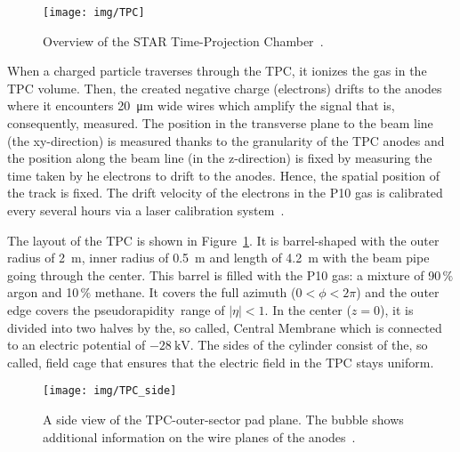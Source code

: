 \begin{figure}[htb]
\begin{center}
 \texttt{[image: img/TPC]}\\
\end{center}
\caption[Overview of the STAR Time-Projection Chamber.]{\label{TPC}Overview of the STAR Time-Projection Chamber~\cite{TpcNim}.}
\end{figure}


 

When a charged particle traverses through the TPC, it ionizes the gas in the TPC volume. Then, the created negative 
charge (electrons) drifts to the anodes where it encounters \SI{20}{\micro\metre} wide wires which amplify the signal that is,
consequently, measured. The position in the transverse plane to the beam line (the xy-direction) is measured thanks to the
granularity of the TPC anodes and the position along the beam line (in the z-direction) is fixed by measuring the time taken by
he electrons to drift to the anodes. Hence, the spatial position of the track is fixed. The drift velocity of the electrons
in the P10 gas is calibrated every several hours via a laser calibration system~\cite{laser}. 


The layout of the TPC is shown in Figure~\ref{TPC}. It is barrel-shaped with the outer radius of \SI{2}{\metre}, inner radius of \SI{0.5}{\metre} and length of \SI{4.2}{\metre}
with the beam pipe going through the center. This barrel is filled with the P10 gas: a mixture of 90$\,\%$ argon and 10$\,\%$ methane. It covers the full azimuth ($0 < \phi < 2\pi$) and the outer edge covers the
pseudorapidity\ range of $|\eta| < 1$. 
In the center ($z = 0$), it is divided into two halves by the, so called, Central Membrane which is connected to an electric 
potential of $-\SI{28}{\kilo\volt}$\@.  The sides of the cylinder consist of the, so called, field cage that ensures that the electric field in the TPC stays uniform.

\begin{figure}[htb]
\begin{center}
 \texttt{[image: img/TPC\_side]}\\
\end{center}
\caption[A side view of the TPC-outer-sector pad plane.]{\label{TPCside}A side view of the TPC-outer-sector pad plane. The bubble shows additional information on the wire planes of the anodes~\cite{TpcNim}.}
\end{figure}

